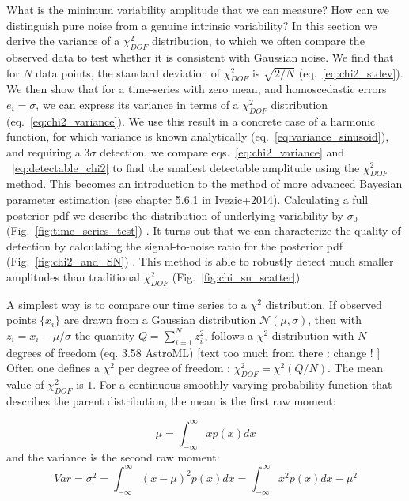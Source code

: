 \documentclass[fleqn,usenatbib]{mnras}  %
\begin{document}
What is the minimum variability amplitude that we can measure? How can we distinguish pure noise from a genuine intrinsic variability? In this section we derive the variance of a $\chi^{2}_{DOF}$ distribution, to which we often compare the observed data to test whether it is consistent with Gaussian noise. We  find that for $N$ data points, the standard deviation of $\chi^{2}_{DOF}$ is $\sqrt{2/N}$ (eq.~\ref{eq:chi2_stdev}).  We then show that for a time-series with zero mean, and homoscedastic errors $e_{i} = \sigma$, we can express its variance in terms of a $\chi^{2}_{DOF}$  distribution (eq.~\ref{eq:chi2_variance}).  We use this result in a concrete case of a harmonic function, for which variance is known analytically (eq.~\ref{eq:variance_sinusoid}), and requiring a $3 \sigma$ detection,  we compare eqs.~\ref{eq:chi2_variance} and ~\ref{eq:detectable_chi2} to find the smallest detectable amplitude using the $\chi^{2}_{DOF}$ method.  This becomes an introduction to the method of  more advanced Bayesian parameter estimation  (see chapter 5.6.1 in Ivezic+2014). Calculating a full posterior pdf we describe the distribution of underlying variability by $\sigma_{0}$  (Fig.~\ref{fig:time_series_test}) .  It turns out that we can characterize the quality of detection by calculating  the signal-to-noise ratio for the posterior pdf (Fig.~\ref{fig:chi2_and_SN}) .  This method is able to robustly detect much smaller amplitudes than traditional $\chi^{2}_{DOF}$  (Fig.~\ref{fig:chi_sn_scatter})

A simplest way is to compare our time series to a $\chi^{2}$  distribution. If observed points $\{x_{i}\}$ are drawn from a Gaussian distribution  $\mathcal{N}(\mu,\sigma)$, then with  $z_{i} = x_{i} - \mu / \sigma$ the quantity $Q = \sum_{i=1}^{N}{z_{i}^{2}}$, follows a  $\chi^{2}$ distribution with $N$ degrees of freedom (eq. 3.58 AstroML)  [text too much from there : change ! ]
Often one defines a $\chi^{2}$ per degree of freedom : $\chi^{2}_{DOF} = \chi^{2}(Q/N)$. The mean value of $\chi^{2}_{DOF}$ is $1$.  For a continuous smoothly varying probability function that describes the parent distribution, the mean is the first raw moment:


\begin{equation}
\mu = \int_{-\infty}^{\infty}{x p(x) dx}
\end{equation} 
and the variance is the second raw moment:
\begin{equation}
Var = \sigma^{2} =  \int_{-\infty}^{\infty}{(x-\mu)^{2} p(x) dx} =  \int_{-\infty}^{\infty}{x^{2} p(x) dx} - \mu^{2}
\end{equation}
\end{document}
